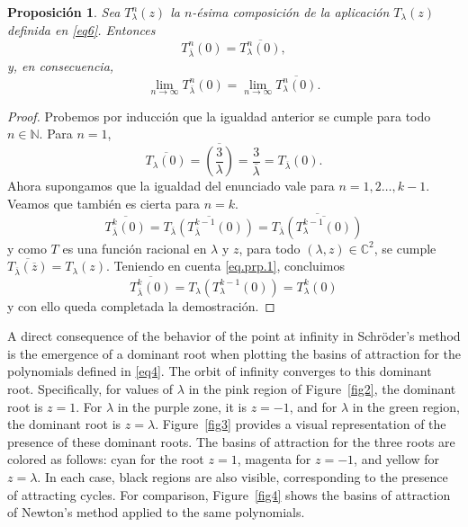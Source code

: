\IfFileExists{aims.cls}{\documentclass{aims}}{\documentclass[11pt]{article}}
\numberwithin{equation}{section}
\theoremstyle{thmstyleone}%
\newtheorem{proposition}{Proposición}%
\theoremstyle{thmstyletwo}%
\theoremstyle{thmstylethree}%
\begin{document}
\begin{proposition}\label{prop3}
Sea $T^n_{\lambda}(z)$ la $n$-ésima composición de la aplicación $T_{\lambda}(z)$ definida en \eqref{eq6}. Entonces
\[
T^n_{\overline{\lambda}}(0)=\overline{T^n_\lambda(0)},
\]
y, en consecuencia,
\[
\lim_{n\to \infty}T^n_{\overline{\lambda}}(0)=\lim_{n\to \infty}\overline{T^n_\lambda(0)}.
\]
\end{proposition}

\begin{proof}
Probemos por inducción que la igualdad anterior se cumple para todo $n\in \mathbb{N}$. Para $n=1$,
\begin{equation*}
\overline{T_\lambda(0)}=\overline{\left( \frac{3}{\lambda}\right) }=\frac{3}{\overline{\lambda}}=T_{\overline{\lambda}}(0).
\end{equation*}
Ahora supongamos que la igualdad del enunciado vale para $n=1, 2\dots, k-1$. Veamos que también es cierta para $n=k$.
\begin{equation}\label{eq.prp.1}
\overline{T^k_{\overline{\lambda}}(0)}=\overline{T_{\overline{\lambda}}\left( T^{k-1}_{\overline{\lambda}}(0)\right)}=\overline{T_{\overline{\lambda}}\left( \overline{T^{k-1}_{\lambda}(0)}\right)}
\end{equation}
y como $T$ es una función racional en $\lambda$ y $z$, para todo $(\lambda,z)\in \mathbb{C}^2$, se cumple $\overline{T_{\overline{\lambda}}(\overline{z})}=T_\lambda(z)$. Teniendo en cuenta \eqref{eq.prp.1}, concluimos
\begin{equation*}
\overline{T^k_{\overline{\lambda}}(0)}=T_{\lambda}\left( T_\lambda^{k-1}(0)\right) = T_\lambda^k(0)
\end{equation*}
y con ello queda completada la demostración.
\end{proof}

A direct consequence of the behavior of the point at infinity in Schröder's method is the emergence of a dominant root when plotting the basins of attraction for the polynomials defined in \eqref{eq4}. The orbit of infinity converges to this dominant root. Specifically, for values of $\lambda$ in the pink region of Figure~\ref{fig2}, the dominant root is $z=1$. For $\lambda$ in the purple zone, it is $z=-1$, and for $\lambda$ in the green region, the dominant root is $z=\lambda$.  Figure~\ref{fig3} provides a visual representation of the presence of these dominant roots. The basins of attraction for the three roots are colored as follows: cyan for the root $z=1$, magenta for $z=-1$, and yellow  for $z=\lambda$. In each case, black regions are also visible, corresponding to the presence of attracting cycles. For comparison, Figure~\ref{fig4} shows the basins of attraction of Newton's method applied to the same polynomials.
\end{document}
